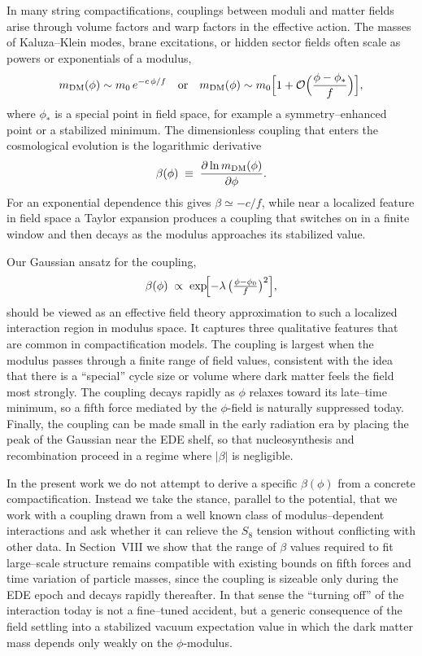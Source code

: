 \documentclass[a4paper,11pt]{article}
\begin{document}
In many string compactifications, couplings between moduli and matter fields arise through volume factors and warp factors in the effective action. The masses of Kaluza--Klein modes, brane excitations, or hidden sector fields often scale as powers or exponentials of a modulus,
\begin{equation}
m_{\rm DM}(\phi) \sim m_0\,e^{-c\,\phi/f} \quad \text{or} \quad m_{\rm DM}(\phi) \sim m_0\Bigl[1 + \mathcal{O}\Bigl(\frac{\phi-\phi_\ast}{f}\Bigr)\Bigr],
\end{equation}
where $\phi_\ast$ is a special point in field space, for example a symmetry--enhanced point or a stabilized minimum. The dimensionless coupling that enters the cosmological evolution is the logarithmic derivative
\begin{equation}
\beta(\phi) \;\equiv\; \frac{\partial \ln m_{\rm DM}(\phi)}{\partial \phi}.
\end{equation}
For an exponential dependence this gives $\beta \simeq -c/f$, while near a localized feature in field space a Taylor expansion produces a coupling that switches on in a finite window and then decays as the modulus approaches its stabilized value.

Our Gaussian ansatz for the coupling,
\begin{equation}
\beta(\phi) \;\propto\; \exp\!\Bigl[-\lambda\,\bigl(\tfrac{\phi-\phi_0}{f}\bigr)^2\Bigr],
\end{equation}
should be viewed as an effective field theory approximation to such a localized interaction region in modulus space. It captures three qualitative features that are common in compactification models. The coupling is largest when the modulus passes through a finite range of field values, consistent with the idea that there is a ``special'' cycle size or volume where dark matter feels the field most strongly. The coupling decays rapidly as $\phi$ relaxes toward its late--time minimum, so a fifth force mediated by the $\phi$-field is naturally suppressed today. Finally, the coupling can be made small in the early radiation era by placing the peak of the Gaussian near the EDE shelf, so that nucleosynthesis and recombination proceed in a regime where $|\beta|$ is negligible.

In the present work we do not attempt to derive a specific $\beta(\phi)$ from a concrete compactification. Instead we take the stance, parallel to the potential, that we work with a coupling drawn from a well known class of modulus--dependent interactions and ask whether it can relieve the $S_8$ tension without conflicting with other data. In Section~VIII we show that the range of $\beta$ values required to fit large--scale structure remains compatible with existing bounds on fifth forces and time variation of particle masses, since the coupling is sizeable only during the EDE epoch and decays rapidly thereafter. In that sense the ``turning off'' of the interaction today is not a fine--tuned accident, but a generic consequence of the field settling into a stabilized vacuum expectation value in which the dark matter mass depends only weakly on the $\phi$-modulus.
\end{document}
